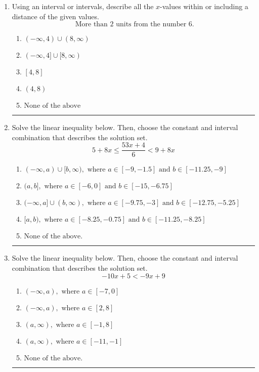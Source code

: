 \documentclass[14pt]{extbook}
\newcommand{\litem}[1]{\item#1\hspace*{-1cm}\rule{\textwidth}{0.4pt}}
\begin{document}
\begin{enumerate}
{\begin{enumerate}[label=\Alph*.]
\end{enumerate} }
\litem{
Using an interval or intervals, describe all the $x$-values within or including a distance of the given values.\[ \text{ More than } 2 \text{ units from the number } 6. \]\begin{enumerate}[label=\Alph*.]
\item \( (-\infty, 4) \cup (8, \infty) \)
\item \( (-\infty, 4] \cup [8, \infty) \)
\item \( [4, 8] \)
\item \( (4, 8) \)
\item \( \text{None of the above} \)

\end{enumerate} }
\litem{
Solve the linear inequality below. Then, choose the constant and interval combination that describes the solution set.\[ 5 + 8 x \leq \frac{53 x + 4}{6} < 9 + 8 x \]\begin{enumerate}[label=\Alph*.]
\item \( (-\infty, a) \cup [b, \infty), \text{ where } a \in [-9, -1.5] \text{ and } b \in [-11.25, -9] \)
\item \( (a, b], \text{ where } a \in [-6, 0] \text{ and } b \in [-15, -6.75] \)
\item \( (-\infty, a] \cup (b, \infty), \text{ where } a \in [-9.75, -3] \text{ and } b \in [-12.75, -5.25] \)
\item \( [a, b), \text{ where } a \in [-8.25, -0.75] \text{ and } b \in [-11.25, -8.25] \)
\item \( \text{None of the above.} \)

\end{enumerate} }
\litem{
Solve the linear inequality below. Then, choose the constant and interval combination that describes the solution set.\[ -10x + 5 < -9x + 9 \]\begin{enumerate}[label=\Alph*.]
\item \( (-\infty, a), \text{ where } a \in [-7, 0] \)
\item \( (-\infty, a), \text{ where } a \in [2, 8] \)
\item \( (a, \infty), \text{ where } a \in [-1, 8] \)
\item \( (a, \infty), \text{ where } a \in [-11, -1] \)
\item \( \text{None of the above}. \)


\end{enumerate}}
\end{enumerate}
\end{document}
